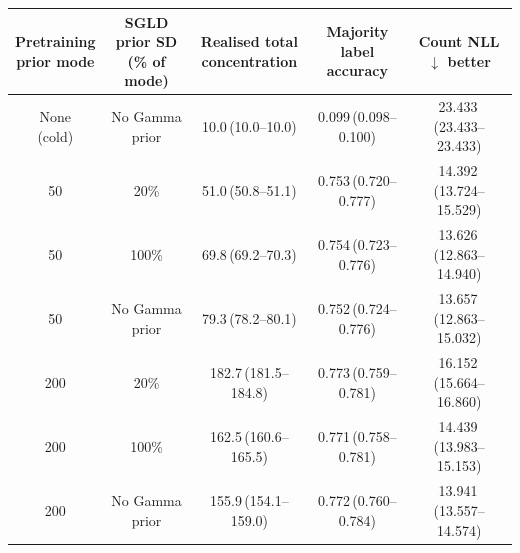 \begin{tabular}{ccccc}
\toprule
\shortstack{Pretraining\\prior mode} & \shortstack{SGLD prior SD\\(\% of mode)} & \shortstack{Realised total\\concentration} & \shortstack{Majority label\\accuracy} & \shortstack{Count NLL\\$\downarrow$ better} \\
\midrule
\shortstack{None\\(cold)} & No Gamma prior & 10.0\,(10.0--10.0) & 0.099\,(0.098--0.100) & 23.433\,(23.433--23.433) \\
\midrule
50 & 20\% & 51.0\,(50.8--51.1) & 0.753\,(0.720--0.777) & 14.392\,(13.724--15.529) \\
50 & 100\% & 69.8\,(69.2--70.3) & 0.754\,(0.723--0.776) & 13.626\,(12.863--14.940) \\
50 & No Gamma prior & 79.3\,(78.2--80.1) & 0.752\,(0.724--0.776) & 13.657\,(12.863--15.032) \\
\midrule
200 & 20\% & 182.7\,(181.5--184.8) & 0.773\,(0.759--0.781) & 16.152\,(15.664--16.860) \\
200 & 100\% & 162.5\,(160.6--165.5) & 0.771\,(0.758--0.781) & 14.439\,(13.983--15.153) \\
200 & No Gamma prior & 155.9\,(154.1--159.0) & 0.772\,(0.760--0.784) & 13.941\,(13.557--14.574) \\
\bottomrule
\end{tabular}
